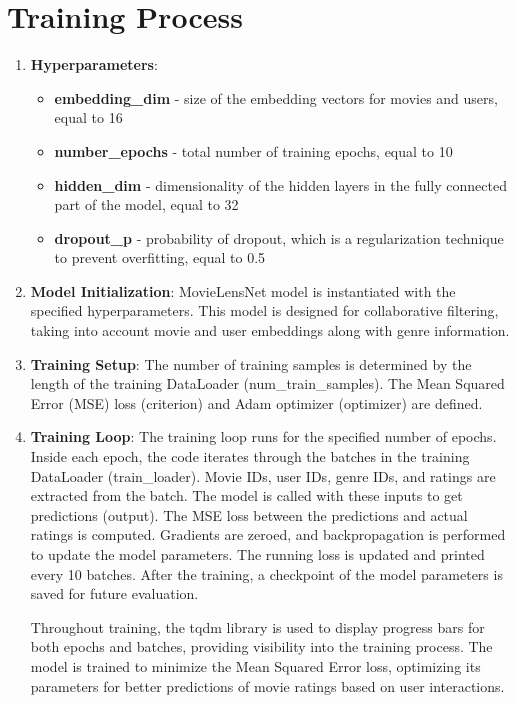 \documentclass[]{article}
\begin{document}
	\section{Training Process}
	
	\begin{enumerate}
		\item \textbf{Hyperparameters}: 
		\begin{itemize}
			\item \textbf{embedding\_dim} - size of the embedding vectors for movies and users, equal to 16
			\item \textbf{number\_epochs} - total number of training epochs, equal to 10
			\item \textbf{hidden\_dim} - dimensionality of the hidden layers in the fully connected part of the model, equal to 32
			\item \textbf{dropout\_p} - probability of dropout, which is a regularization technique to prevent overfitting, equal to 0.5
		\end{itemize}
		\item \textbf{Model Initialization}: MovieLensNet model is instantiated with the specified hyperparameters. This model is designed for collaborative filtering, taking into account movie and user embeddings along with genre information.
		\item \textbf{Training Setup}: The number of training samples is determined by the length of the training DataLoader (num\_train\_samples). The Mean Squared Error (MSE) loss (criterion) and Adam optimizer (optimizer) are defined.
		\item \textbf{Training Loop}: The training loop runs for the specified number of epochs.
		Inside each epoch, the code iterates through the batches in the training DataLoader (train\_loader). Movie IDs, user IDs, genre IDs, and ratings are extracted from the batch.
		The model is called with these inputs to get predictions (output). The MSE loss between the predictions and actual ratings is computed. Gradients are zeroed, and backpropagation is performed to update the model parameters. The running loss is updated and printed every 10 batches. After the training, a checkpoint of the model parameters is saved for future evaluation.
		
		Throughout training, the tqdm library is used to display progress bars for both epochs and batches, providing visibility into the training process. The model is trained to minimize the Mean Squared Error loss, optimizing its parameters for better predictions of movie ratings based on user interactions.

	\end{enumerate}
	
\end{document}
